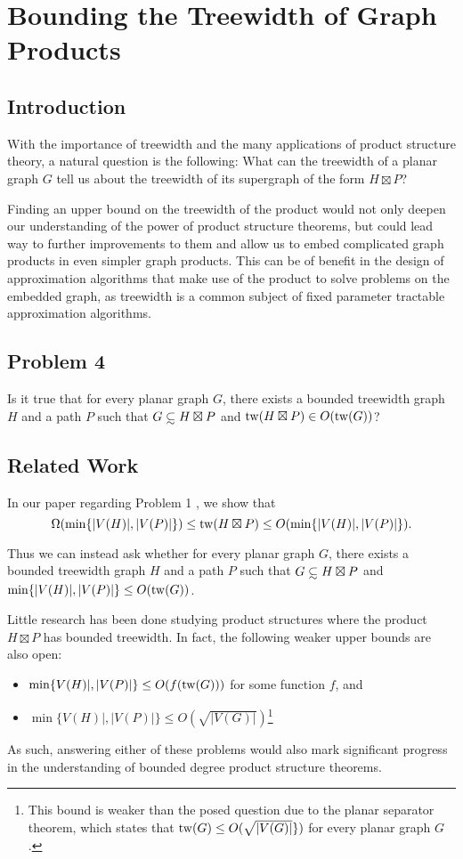 \documentclass[../main.tex]{subfiles}
\begin{document}
	
	\section{Bounding the Treewidth of Graph Products}
	\subsection{Introduction}
	With the importance of treewidth and the many applications of product structure theory, a natural question is the following: What can the treewidth of a planar graph $G$ tell us about the treewidth of its supergraph of the form $H\boxtimes P$?
	
	Finding an upper bound on the treewidth of the product would not only deepen our understanding of the power of product structure theorems, but could lead way to further improvements to them and allow us to embed complicated graph products in even simpler graph products. This can be of benefit in the design of approximation algorithms that make use of the product to solve problems on the embedded graph, as treewidth is a common subject of fixed parameter tractable approximation algorithms\cite{DH05}.
	\subsection{Problem 4}
	  Is it true that for every planar graph $G$, there exists a bounded treewidth graph $H$ and a path $P$ such that $G \subsetsim H\boxtimes P$ and $\operatorname{tw}(H\boxtimes P) \in O(\operatorname{tw}(G))$? 
	
	\subsection{Related Work}
	In our paper regarding Problem 1 \cite[Lemma~3, Equation~(2)]{DMWW24}, we show that $$\Omega(\min\{|V(H)|,|V(P)|\})\leq  \operatorname{tw}( H\boxtimes P) \leq O(\min\{|V(H)|,|V(P)|\}).$$ 
	
	Thus we can instead ask whether for every planar graph $G$, there exists a bounded treewidth graph $H$ and a path $P$ such that $G\subsetsim H\boxtimes P$ and $\min\{|V(H)|,|V(P)|\} \leq O(\operatorname{tw}(G))$. 
	
	Little research has been done studying product structures where the  product $H\boxtimes P$ has bounded treewidth. In fact, the following weaker upper bounds are also open:
	\begin{itemize}
	\item$\min\{V(H)|,|V(P)|\} \leq O(f(\operatorname{tw}(G)))$ for some function $f$, and
	\item $\min\{V(H)|,|V(P)|\} \leq O(\sqrt{|V(G)|})$\footnote{This bound is weaker than the posed question due to the planar separator theorem\cite{LT79}, which states that $\operatorname{tw}(G) \le O(\sqrt{|V(G)|}\})$ for every planar graph $G$.}
	\end{itemize} 
	As such, answering either of these problems would also mark significant progress in the understanding of bounded degree product structure theorems.
	
\end{document}

